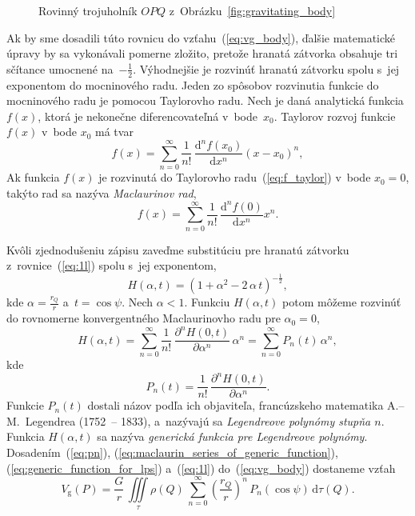 \documentclass[a4paper,12pt]{book}
\newcommand{\diff}{\mathrm d}
\newcommand{\gidx}{\mathrm g}
\begin{document}
\begin{figure}
\centering

\caption{Rovinný trojuholník $OPQ$ z~Obrázku~\ref{fig:gravitating_body}}
\label{fig:distance_l}
\end{figure}

Ak by sme dosadili túto rovnicu do vzťahu~(\ref{eq:vg_body}), ďalšie
matematické úpravy by sa vykonávali pomerne zložito, pretože hranatá zátvorka
obsahuje tri sčítance umocnené na~$-\frac{1}{2}$.  Výhodnejšie je rozvinúť
hranatú zátvorku spolu s~jej exponentom do mocninového radu.  Jeden zo spôsobov
rozvinutia funkcie do mocninového radu je pomocou Taylorovho radu.  Nech je 
daná analytická funkcia $f(x)$, ktorá je nekonečne diferencovateľná 
v~bode~$x_0$.  Taylorov rozvoj funkcie~$f(x)$ v~bode $x_0$ má tvar
%
\begin{equation}
\label{eq:f_taylor}
f(x) = \sum_{n = 0}^\infty \frac{1}{n!} \, \frac{\diff^n f(x_0)}{\diff x^n} (x 
- x_0)^n{,}
\end{equation}
%
Ak funkcia $f(x)$ je rozvinutá do Taylorovho radu~(\ref{eq:f_taylor}) v~bode 
$x_0 = 0$, takýto rad sa nazýva \emph{Maclaurinov rad},
%
\begin{equation}
f(x) = \sum_{n = 0}^\infty \frac{1}{n!} \, \frac{\diff^n f(0)}{\diff x^n}
x^n{.}
\end{equation}

Kvôli zjednodušeniu zápisu zaveďme substitúciu pre hranatú zátvorku
z~rovnice~(\ref{eq:1l}) spolu s~jej exponentom,
%
\begin{equation}
\label{eq:generic_function_for_lps}
H(\alpha, t) = \left(1 + \alpha^2 - 2 \, \alpha\, t \right)^{-\frac{1}{2}}{,}
\end{equation}
%
kde $\alpha = \frac{r_Q}{r}$ a~$t = \cos\psi$.  Nech $\alpha < 1$.  Funkciu
$H(\alpha, t)$ potom môžeme rozvinúť do rovnomerne konvergentného Maclaurinovho
radu pre $\alpha_0 = 0$,
%
\begin{equation}
\label{eq:maclaurin_series_of_generic_function}
H(\alpha, t) = \sum_{n = 0}^\infty \frac{1}{n!} \, \frac{\partial^n H(0,
t)}{\partial \alpha^n} \, \alpha^n = \sum_{n = 0}^\infty P_n(t) \, \alpha^n{,}
\end{equation}
%
kde
%
\begin{equation}
\label{eq:pn}
P_n(t) = \frac{1}{n!} \, \frac{\partial^n H(0, t)}{\partial \alpha^n}{.}
\end{equation}
%
Funkcie $P_n(t)$ dostali názov podľa ich objaviteľa, francúzskeho matematika
A.--M.~Legendrea (1752~-- 1833), a~nazývajú sa \emph{Legendreove polynómy
stupňa $n$}.  Funkcia $H(\alpha, t)$ sa nazýva \emph{generická funkcia pre
Legendreove polynómy}.  Dosadením~(\ref{eq:pn}),
(\ref{eq:maclaurin_series_of_generic_function}),
(\ref{eq:generic_function_for_lps}) a~(\ref{eq:1l}) do~(\ref{eq:vg_body})
dostaneme vzťah
%
\begin{equation}
\label{eq:vg_legpol}
V_\gidx(P) = \frac{G}{r} \, \iiint\limits_{\tau} \rho(Q) \, \sum_{n 
= 0}^{\infty} \left( \frac{r_Q}{r} \right)^n \, P_n(\cos\psi) \, 
\diff\tau(Q){.}
\end{equation}
\end{document}
